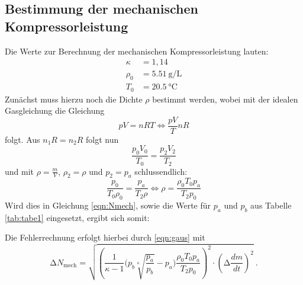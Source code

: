 \subsection{Bestimmung der mechanischen Kompressorleistung}
Die Werte zur Berechnung der mechanischen Kompressorleistung lauten:
\begin{align*}
  \kappa &= 1,14 \\
  \rho_0 &= \SI{5.51}{\gram\per\liter} \\
  T_0 &= \SI{20.5}{\celsius}
\end{align*}
Zunächst muss hierzu noch die Dichte $\rho$ bestimmt werden, wobei mit der idealen Gasgleichung
die Gleichung
\begin{equation}
  pV =nRT \iff \frac{pV}{T}{nR}
\end{equation}
folgt. Aus $n_1R =n_2R$ folgt nun
\begin{equation}
  \frac{p_0 V_0}{T_0} = \frac{p_2 V_2}{T_2}
\end{equation}
und mit $\rho = \frac{m}{V}$, $\rho_2=\rho$ und $p_2 =p_a$ schlussendlich:
\begin{equation}
  \frac{p_0}{T_0\rho_0} = \frac{p_a}{T_2 \rho} \iff \rho = \frac{\rho_0 T_0 p_a}{T_2p_0}
\end{equation}
Wird dies in Gleichung \ref{eqn:Nmech}, sowie die Werte für $p_a$ und $p_b$ aus Tabelle
\ref{tab:tabe1} eingesetzt, ergibt sich somit:

Die Fehlerrechnung erfolgt hierbei durch \ref{eqn:gaus} mit
\begin{equation}
  \increment N_{\text{mech}} = \sqrt{\left(\frac{1}{\kappa-1}\Biggl(p_{b}\sqrt[\kappa]{\frac{p_{a}}{p_{b}}}-p_{a}\Biggr)
  \frac{\rho_0 T_0 p_a}{T_2p_0}\right)^2 \cdot \left(\increment \frac{dm}{dt} \right)^2} \: .
  \label{eqn:f4}
\end{equation}
